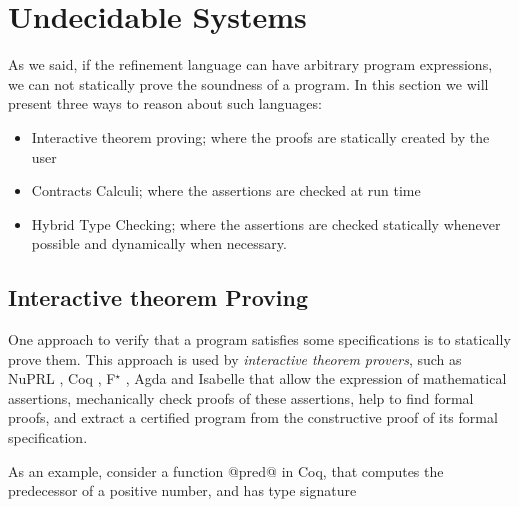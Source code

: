 \newcommand\trefc[4]{\ensuremath{\langle\{#1 : #2  \mid #3 \}\rangle^{#4}}}

\newcommand\tlabel{T-Label}
\newcommand\tcast{T-Cast}

\newcommand\cbase{C-Base}
\newcommand\cfunction{C-Fun}


\newcommand\elabel[1]{\ensuremath{\Uparrow \ #1}}
\newcommand\ecast[3]{\ensuremath{\langle #1 \Rightarrow #2 \rangle^{#3}}}

\newcommand\isCompatible[2]{\ensuremath{ #1 \Vert #2 }}

\section{Undecidable Systems}\label{sec:undec}

As we said, if the refinement language can have arbitrary program expressions,
we can not statically prove the soundness of a program. 
%
In this section we will present three ways to reason about such languages:
\begin{itemize}
\item Interactive theorem proving; where the proofs are statically created by the user
\item Contracts Calculi; where the assertions are checked at run time
\item Hybrid Type Checking; where the assertions are checked statically whenever possible
and dynamically when necessary.
\end{itemize}



\subsection{Interactive theorem Proving}


One approach to verify that a program satisfies some 
specifications is to statically prove them.
% 
This approach is used by \textit{interactive theorem provers}, 
such as 
NuPRL \cite{Constable86},
Coq \cite{coq-book}, F$^\star$ \cite{SwamyCFSBY11}, Agda \cite{norell07}
and Isabelle \cite{NPW2002}
that allow the 
expression of mathematical assertions, 
mechanically check proofs of these assertions, 
help to find formal proofs, 
and extract a certified program from 
the constructive proof of its formal specification.


As an example, consider a function @pred@ in Coq, 
that computes the predecessor of a positive number,
and has type signature

